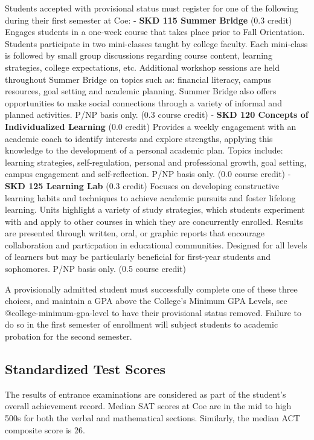 \documentclass[
  letterpaper,
]{scrbook}
\begin{document}
Students accepted with provisional status must register for one of the
following during their first semester at Coe: - \textbf{SKD 115 Summer
Bridge} (0.3 credit) Engages students in a one-week course that takes
place prior to Fall Orientation. Students participate in two
mini-classes taught by college faculty. Each mini-class is followed by
small group discussions regarding course content, learning strategies,
college expectations, etc. Additional workshop sessions are held
throughout Summer Bridge on topics such as: financial literacy, campus
resources, goal setting and academic planning. Summer Bridge also offers
opportunities to make social connections through a variety of informal
and planned activities. P/NP basis only. (0.3 course credit) -
\textbf{SKD 120 Concepts of Individualized Learning} (0.0 credit)
Provides a weekly engagement with an academic coach to identify
interests and explore strengths, applying this knowledge to the
development of a personal academic plan. Topics include: learning
strategies, self-regulation, personal and professional growth, goal
setting, campus engagement and self-reflection. P/NP basis only. (0.0
course credit) - \textbf{SKD 125 Learning Lab} (0.3 credit) Focuses on
developing constructive learning habits and techniques to achieve
academic pursuits and foster lifelong learning. Units highlight a
variety of study strategies, which students experiment with and apply to
other courses in which they are concurrently enrolled. Results are
presented through written, oral, or graphic reports that encourage
collaboration and particpation in educational communities. Designed for
all levels of learners but may be particularly beneficial for first-year
students and sophomores. P/NP basis only. (0.5 course credit)

A provisionally admitted student must successfully complete one of these
three choices, and maintain a GPA above the College's Minimum GPA
Levels, see @college-minimum-gpa-level to have their provisional status
removed. Failure to do so in the first semester of enrollment will
subject students to academic probation for the second semester.

\subsection{Standardized Test Scores}\label{standardized-test-scores}

The results of entrance examinations are considered as part of the
student's overall achievement record. Median SAT scores at Coe are in
the mid to high 500s for both the verbal and mathematical sections.
Similarly, the median ACT composite score is 26.
\end{document}
